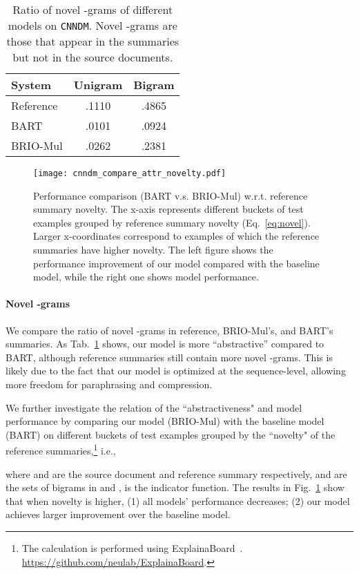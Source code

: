 \documentclass[11pt]{article}
\newcommand{\model}{BRIO\xspace}
\begin{document}
\begin{table}[t!]
\centering
\small
\begin{tabular}{lcc}
\toprule
\textbf{System} & \textbf{Unigram} & \textbf{Bigram} \\
\midrule
 Reference & .1110 & .4865  \\
\midrule
 BART & .0101 & .0924 \\
 \model-Mul & .0262 & .2381 \\
\bottomrule
\end{tabular}
\caption{\label{tab:novel} Ratio of novel -grams of different models on \texttt{CNNDM}.
Novel -grams are those that appear in the summaries but not in the source documents.}
\end{table}

\begin{figure}[t!]
    \centering
    \texttt{[image: cnndm\_compare\_attr\_novelty.pdf]}
    \caption{Performance comparison (BART v.s. \model-Mul) w.r.t. reference summary novelty. The x-axis represents different buckets of test examples grouped by reference summary novelty (Eq.~\ref{eq:novel}). Larger x-coordinates correspond to examples of which the reference summaries have higher novelty. 
    The left figure shows the performance improvement of our model compared with the baseline model, while the right one shows model performance.}
    \label{fig:novelty}
\end{figure}


\paragraph{Novel -grams} We compare the ratio of novel -grams in reference, \model-Mul's, and BART's summaries.
As Tab.~\ref{tab:novel} shows, our model is more ``abstractive'' compared to BART, although reference summaries still contain more novel -grams.
This is likely due to the fact that our model is optimized at the sequence-level, allowing more freedom for paraphrasing and compression.

We further investigate the relation of the ``abstractiveness" and model performance by comparing our model (\model-Mul) with the baseline model (BART) on different buckets of test examples grouped by the ``novelty" of the reference summaries,\footnote{The calculation is performed using ExplainaBoard~\citep{liu-etal-2021-explainaboard}. \url{https://github.com/neulab/ExplainaBoard}.} i.e.,

where  and  are the source document and reference summary respectively,  and  are the sets of bigrams in  and ,  is the indicator function.
The results in Fig.~\ref{fig:novelty} show that when novelty is higher, (1) all models' performance decreases; (2) our model achieves larger improvement over the baseline model.
\end{document}
